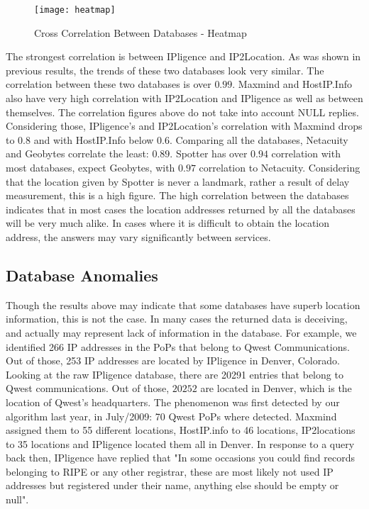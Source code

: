 \begin{figure}
\begin{minipage}[b]{\linewidth}
\centering
\texttt{[image: heatmap]}
\caption{Cross Correlation Between Databases - Heatmap}
\label{fig:heatmap}
\end{minipage}
\end{figure}


The strongest correlation is between IPligence and IP2Location. As
was shown in previous results, the trends of these two databases
look very similar. The correlation between these two databases is
over $0.99$. Maxmind and HostIP.Info also have very high correlation
with IP2Location and IPligence as well as between themselves. The
correlation figures above do not take into account NULL replies.
Considering those, IPligence's and IP2Location's correlation with
Maxmind drops to $0.8$ and with HostIP.Info below $0.6$. Comparing
all the databases, Netacuity and Geobytes correlate the least:
$0.89$. Spotter has over $0.94$ correlation with most databases,
expect Geobytes, with $0.97$ correlation to Netacuity. Considering
that the location given by Spotter is never a landmark, rather a
result of delay measurement, this is a high figure. The high
correlation between the databases indicates that in most cases the
location addresses returned by all the databases will be very much
alike. In cases where it is difficult to obtain the location
address, the answers may vary significantly between services.

\subsection{Database Anomalies}
Though the results above may indicate that some databases have
superb location information, this is not the case. In many cases the
returned data is deceiving, and actually may represent lack of
information in the database. For example, we identified 266 IP
addresses in the PoPs that belong to Qwest Communications. Out of
those, 253 IP addresses are located by IPligence in Denver,
Colorado. Looking at the raw IPligence database, there are 20291
entries that belong to Qwest communications. Out of those, $20252$
are located in Denver, which is the location of Qwest's
headquarters. The phenomenon was first detected by our algorithm
last year, in July/2009: 70 Qwest PoPs where detected. Maxmind
assigned them to 55 different locations, HostIP.info to 46
locations, IP2locations to 35 locations and IPligence located them
all in Denver. In response to a query back then, IPligence have
replied that "In some occasions you could find records belonging to
RIPE or any other registrar, these are most likely not used IP
addresses but registered under their name, anything else should be
empty or null".

